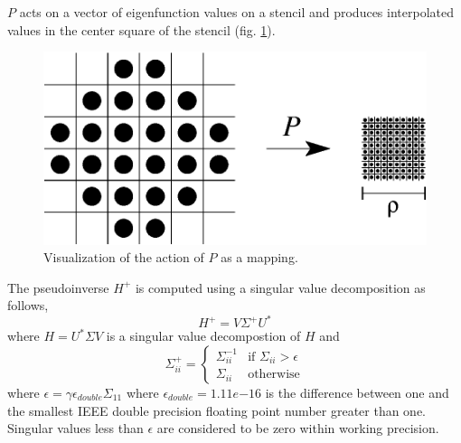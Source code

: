 \documentclass{report}
\begin{document}
$P$ acts on a vector of eigenfunction values on a stencil and produces interpolated values in the center square of the stencil (fig. \ref{fig:upsample_action}).

\begin{figure}
  \begin{center}
    \includegraphics[width=\textwidth]{figs/stencils/upsample_action.eps}
    \caption{Visualization of the action of $P$ as a mapping.}
    \label{fig:upsample_action}
  \end{center}
\end{figure}

The pseudoinverse $H^{+}$ is computed using a singular value decomposition as follows,
\[
H^{+} = V \Sigma^{+} U^{*}
\]
where $H = U^{*} \Sigma V$ is a singular value decompostion of $H$ and
\[
\Sigma^{+}_{ii} =\begin{cases}
\Sigma_{ii}^{-1} & \text{if }\Sigma_{ii} > \epsilon\\
\Sigma_{ii} & \text{otherwise}
\end{cases}
\]
where $\epsilon = \gamma \epsilon_{double} \Sigma_{11}$ where $\epsilon_{double} = 1.11e{-16}$ is the difference between one and the smallest IEEE double precision floating point number greater than one. Singular values less than $\epsilon$ are considered to be zero within working precision.
\end{document}
